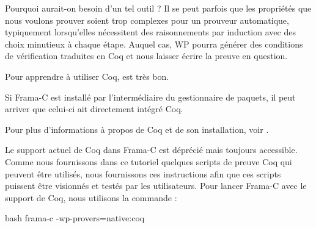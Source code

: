 Pourquoi aurait-on besoin d'un tel outil ? Il se peut parfois que les
propriétés que nous voulons prouver soient trop complexes pour un prouveur
automatique, typiquement lorsqu'elles nécessitent des raisonnements par
induction avec des choix minutieux à chaque étape. Auquel cas, WP pourra
générer des conditions de vérification traduites en Coq et nous laisser écrire
la preuve en question.



Pour apprendre à utiliser Coq,
est très bon.



\begin{Information}
Si Frama-C est installé par l'intermédiaire du gestionnaire de
paquets, il peut arriver que celui-ci ait directement intégré Coq.
\end{Information}


Pour plus d'informations à propos de Coq et de son installation, voir .


Le support actuel de Coq dans Frama-C est déprécié mais toujours
accessible. Comme nous fournissons dans ce tutoriel quelques scripts de preuve
Coq qui peuvent être utilisés, nous fournissons ces instructions afin que
ces scripts puissent être visionnés et testés par les utilisateurs. Pour lancer
Frama-C avec le support de Coq, nous utilisons la commande :


\begin{CodeBlock}{bash}
  frama-c -wp-provers=native:coq
\end{CodeBlock}
